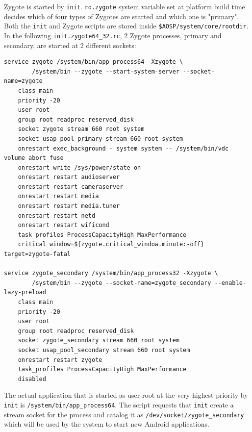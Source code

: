 Zygote is started by \texttt{init}. \texttt{ro.zygote} system variable set at platform build time decides which of four types of Zygotes are started and which one is "primary". Both the \texttt{init} and Zygote scripts are stored inside \texttt{\$AOSP/system/core/rootdir}. In the following \texttt{init.zygote64\_32.rc}, 2 Zygote processes, primary and secondary, are started at 2 different sockets:

\begin{lstlisting}
service zygote /system/bin/app_process64 -Xzygote \
        /system/bin --zygote --start-system-server --socket-name=zygote
    class main
    priority -20
    user root
    group root readproc reserved_disk
    socket zygote stream 660 root system
    socket usap_pool_primary stream 660 root system
    onrestart exec_background - system system -- /system/bin/vdc volume abort_fuse
    onrestart write /sys/power/state on
    onrestart restart audioserver
    onrestart restart cameraserver
    onrestart restart media
    onrestart restart media.tuner
    onrestart restart netd
    onrestart restart wificond
    task_profiles ProcessCapacityHigh MaxPerformance
    critical window=${zygote.critical_window.minute:-off} target=zygote-fatal

service zygote_secondary /system/bin/app_process32 -Xzygote \
        /system/bin --zygote --socket-name=zygote_secondary --enable-lazy-preload
    class main
    priority -20
    user root
    group root readproc reserved_disk
    socket zygote_secondary stream 660 root system
    socket usap_pool_secondary stream 660 root system
    onrestart restart zygote
    task_profiles ProcessCapacityHigh MaxPerformance
    disabled
\end{lstlisting}

The actual application that is started as user root at the very highest priority by \texttt{init} is \texttt{/system/bin/app\_process64}. The script requests that \texttt{init} create a stream socket for the process and catalog it as \texttt{/dev/socket/zygote\_secondary} which will be used by the system to start new Android applications.

